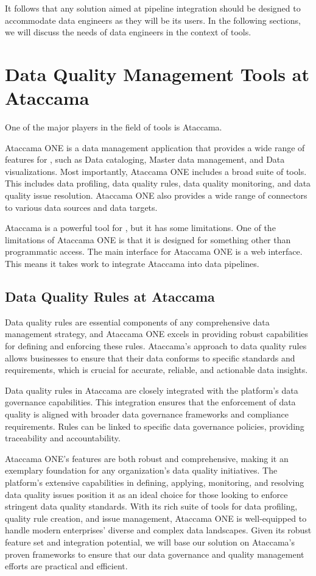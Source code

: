  It follows that any solution aimed at pipeline integration should be designed to accommodate data engineers as they will be its users. In the following sections, we will discuss the needs of data engineers in the context of  tools.

\section{Data Quality Management Tools at Ataccama}

One of the major players in the field of  tools is Ataccama. 

Ataccama ONE is a data management application that provides a wide range of features for , such as Data cataloging, Master data management, and Data visualizations. Most importantly, Ataccama ONE includes a broad suite of  tools. This includes data profiling, data quality rules, data quality monitoring, and data quality issue resolution. Ataccama ONE also provides a wide range of connectors to various data sources and data targets.

Ataccama is a powerful tool for , but it has some limitations. One of the limitations of Ataccama ONE is that it is designed for something other than programmatic access. The main interface for Ataccama ONE is a web interface. This means it takes work to integrate Ataccama into data pipelines.

\subsection{Data Quality Rules at Ataccama}

Data quality rules are essential components of any comprehensive data management strategy, and Ataccama ONE excels in providing robust capabilities for defining and enforcing these rules. Ataccama's approach to data quality rules allows businesses to ensure that their data conforms to specific standards and requirements, which is crucial for accurate, reliable, and actionable data insights.

Data quality rules in Ataccama are closely integrated with the platform's data governance capabilities. This integration ensures that the enforcement of data quality is aligned with broader data governance frameworks and compliance requirements. Rules can be linked to specific data governance policies, providing traceability and accountability.

Ataccama ONE's  features are both robust and comprehensive, making it an exemplary foundation for any organization's data quality initiatives. The platform's extensive capabilities in defining, applying, monitoring, and resolving data quality issues position it as an ideal choice for those looking to enforce stringent data quality standards. With its rich suite of tools for data profiling, quality rule creation, and issue management, Ataccama ONE is well-equipped to handle modern enterprises' diverse and complex data landscapes. Given its robust feature set and integration potential, we will base our solution on Ataccama's proven frameworks to ensure that our data governance and quality management efforts are practical and efficient.

